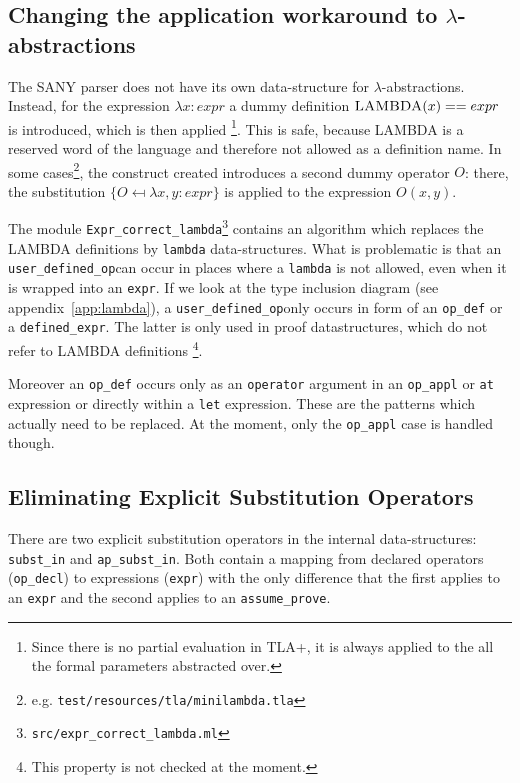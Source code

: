 \documentclass[10pt,a4paper]{article}
\newcommand{\sub}[2]{\ensuremath{#1 \mapsfrom #2 }}
\newcommand{\subst}[1]{\ensuremath{\{#1\}}}
\newcommand{\filename}[1]{\texttt{#1}}
\newcommand{\modulename}[1]{\texttt{#1}}
\newcommand{\datatype}[1]{\texttt{#1}}
\newcommand{\keyword}[1]{\textsc{#1}}
\newcommand{\dtlambda}{\datatype{lambda}}
\newcommand{\dtuop}{\datatype{user\_defined\_op}}
\newcommand{\dtopdef}{\datatype{op\_def}}
\newcommand{\dtopdecl}{\datatype{op\_decl}}
\newcommand{\dtdefinedexp}{\datatype{defined\_expr}}
\newcommand{\dtopappl}{\datatype{op\_appl}}
\newcommand{\dtsubst}{\datatype{subst\_in}}
\newcommand{\dtapsubst}{\datatype{ap\_subst\_in}}
\newcommand{\dtexpr}{\datatype{expr}}
\newcommand{\dtap}{\datatype{assume\_prove}}
\begin{document}
\subsection{Changing the application workaround to $\lambda$-abstractions}
\label{sec:lambda}

The SANY parser does not have its own data-structure for $\lambda$-abstractions.
 Instead, for the expression $\lambda x:expr$ a dummy definition
 $\keyword{LAMBDA}(x) == expr$ is introduced, which is then applied
\footnote{Since there is no partial evaluation in TLA+, it is always applied to
 the all the formal parameters abstracted over.}. This is safe, because
 \keyword{LAMBDA} is a reserved word of the language and therefore not allowed
 as a definition name.
 In some cases\footnote{e.g. \filename{test/resources/tla/minilambda.tla}}, the
 construct created introduces a second dummy operator $O$: there, the
 substitution \subst{\sub{O}{ \lambda x, y : expr}} is applied to the expression
 $O(x, y)$.

The module \modulename{Expr\_correct\_lambda}\footnote{
\filename{src/expr\_correct\_lambda.ml}} contains an algorithm
 which replaces the \keyword{LAMBDA} definitions by \dtlambda{}
 data-structures.
 What is problematic is that an \dtuop can occur in places
 where a \dtlambda{} is not allowed, even when it is wrapped into an
 \dtexpr{}. If we look at the type inclusion diagram (see
 appendix~\ref{app:lambda}), a \dtuop only occurs in form
 of an \dtopdef{} or a \dtdefinedexp{}. The latter is only used
 in proof datastructures, which do not refer to \keyword{LAMBDA} definitions
\footnote{This property is not checked at the moment.}.

 Moreover an \dtopdef{} occurs only as an
 \datatype{operator} argument in an \dtopappl{} or \datatype{at}
 expression or directly within a \datatype{let} expression. These are the
 patterns which actually need to be replaced. At the moment, only the
 \dtopappl{} case is handled though.

\subsection{Eliminating Explicit Substitution Operators}
\label{sec:substitution}
There are two explicit substitution operators in the internal data-structures:
 \dtsubst{} and \dtapsubst{}. Both contain a mapping from
 declared operators (\dtopdecl{}) to expressions (\dtexpr{}) with the only
 difference that the first applies to an \dtexpr{} and the second applies to an
 \dtap{}.
\end{document}
